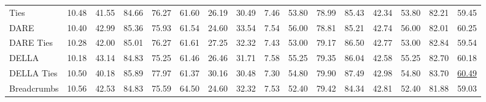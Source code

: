 \begin{table*}
{\begin{tabular}{lcccccccc|c|cc|cccc}
            Ties                              & 10.48                                     & 41.55            & 84.66                                      & 76.27                                  & 61.60                                 & 26.19                                   & 30.49                         & 7.46     & 53.80           & 78.99           & 85.43       & 42.34 & 53.80 & 82.21 & 59.45             \\
            DARE                              & 10.40                                     & 42.99            & 85.36                                      & 75.93                                  & 61.54                                 & 24.60                                   & 33.54                         & 7.54     & 56.00           & 78.81           & 85.21       & 42.74 & 56.00 & 82.01 & 60.25             \\
            DARE Ties                         & 10.28                                     & 42.00            & 85.01                                      & 76.27                                  & 61.61                                 & 27.25                                   & 32.32                         & 7.43     & 53.00           & 79.17           & 86.50       & 42.77 & 53.00 & 82.84 & 59.54             \\
            DELLA                             & 10.18                                     & 43.14            & 84.83                                      & 75.25                                  & 61.46                                 & 26.46                                   & 31.71                         & 7.58     & 55.25           & 79.35           & 86.04       & 42.58 & 55.25 & 82.70 & 60.18             \\
            DELLA  Ties                       & 10.50                                     & 40.18            & 85.89                                      & 77.97                                  & 61.37                                 & 30.16                                   & 30.48                         & 7.30     & 54.80           & 79.90           & 87.49       & 42.98 & 54.80 & 83.70 & \underline{60.49} \\
            Breadcrumbs                       & 10.56                                     & 42.53            & 84.83                                      & 75.59                                  & 64.50                                 & 24.60                                   & 32.32                         & 7.53     & 52.40           & 79.42           & 84.34       & 42.81 & 52.40 & 81.88 & 59.03             \\

\end{tabular}}
\end{table*}
